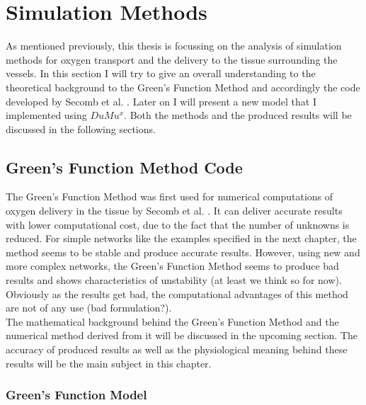 \section{Simulation Methods}

As mentioned previously, this thesis is focussing on the analysis of simulation methods for oxygen transport and the delivery to the tissue surrounding the vessels. In this section I will try to give an overall understanding to the theoretical background to the Green's Function Method and accordingly the code developed by Secomb et al. \cite{Secomb2004}. Later on I will present a new model that I implemented using $DuMu^x$. Both the methods and the produced results will be discussed in the following sections.

\subsection{Green's Function Method Code}

The Green's Function Method was first used for numerical computations of oxygen delivery in the tissue by Secomb et al. \cite{Secomb2004}. It can deliver accurate results with lower computational cost, due to the fact that the number of unknowns is reduced. For simple networks like the examples specified in the next chapter, the method seems to be stable and produce accurate results. However, using new and more complex networks, the Green's Function Method seems to produce bad results and shows characteristics of unstability (at least we think so for now). Obviously as the results get bad, the computational advantages of this method are not of any use (bad formulation?).
\\The mathematical background behind the Green's Function Method and the numerical method derived from it will be discussed in the upcoming section. The accuracy of produced results as well as the physiological meaning behind these results will be the main subject in this chapter.

\subsubsection{Green's Function Model}


